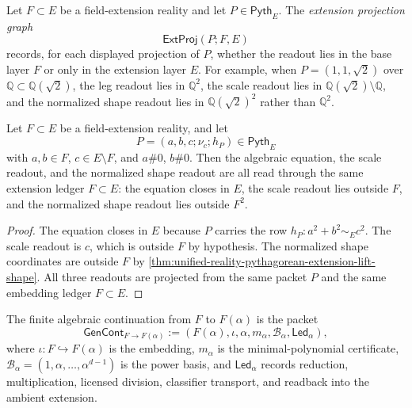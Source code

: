 \begin{definition}
\label{def:unified-reality-extension-projection-graph}
Let $F\subset E$ be a field-extension reality and let
$P\in\mathsf{Pyth}_E$. The \emph{extension projection graph}
$$
\mathsf{ExtProj}(P;F,E)
$$
records, for each displayed projection of $P$, whether the readout lies
in the base layer $F$ or only in the extension layer $E$. For example,
when $P=(1,1,\sqrt{2})$ over
$\mathbb Q\subset\mathbb Q(\sqrt{2})$, the leg readout lies in
$\mathbb Q^2$, the scale readout lies in
$\mathbb Q(\sqrt{2})\setminus\mathbb Q$, and the normalized shape
readout lies in
$\mathbb Q(\sqrt{2})^2$ rather than $\mathbb Q^2$.
\end{definition}

\begin{theorem}
\label{thm:unified-reality-extension-projection-consistency}
Let $F\subset E$ be a field-extension reality, and let
$$
P=(a,b,c;\nu_c;h_P)\in\mathsf{Pyth}_E
$$
with $a,b\in F$, $c\in E\setminus F$, and $a\#0$, $b\#0$. Then the
algebraic equation, the scale readout, and the normalized shape readout
are all read through the same extension ledger $F\subset E$: the
equation closes in $E$, the scale readout lies outside $F$, and the
normalized shape readout lies outside $F^2$.
\end{theorem}

\begin{proof}
The equation closes in $E$ because $P$ carries the row
$h_P:a^2+b^2\sim_Ec^2$. The scale readout is $c$, which is outside $F$
by hypothesis. The normalized shape coordinates are outside $F$ by
\autoref{thm:unified-reality-pythagorean-extension-lift-shape}. All
three readouts are projected from the same packet $P$ and the same
embedding ledger $F\subset E$.
\end{proof}

\begin{definition}
\label{def:unified-reality-algebraic-extension-continuation}
The finite algebraic continuation from $F$ to $F(\alpha)$ is the packet
$$
\mathsf{GenCont}_{F\to F(\alpha)}
:=
(F(\alpha),\iota,\alpha,m_\alpha,\mathcal B_\alpha,\mathsf{Led}_\alpha),
$$
where $\iota:F\hookrightarrow F(\alpha)$ is the embedding,
$m_\alpha$ is the minimal-polynomial certificate,
$\mathcal B_\alpha=(1,\alpha,\ldots,\alpha^{d-1})$ is the power basis,
and $\mathsf{Led}_\alpha$ records reduction, multiplication, licensed
division, classifier transport, and readback into the ambient extension.
\end{definition}

